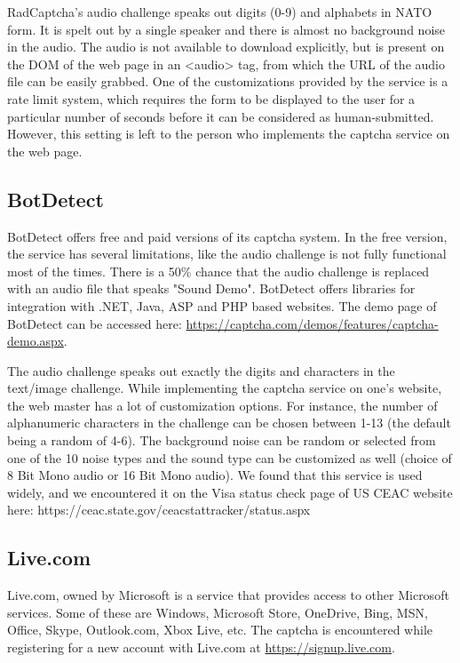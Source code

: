 RadCaptcha's audio challenge speaks out digits (0-9) and alphabets in NATO form. It is 
spelt out by a single speaker and there is almost no background noise in the audio. The 
audio is not available to download explicitly, but is present on the DOM of the web page 
in an <audio> tag, from which the URL of the audio file can be easily grabbed. One of the 
customizations provided by the service is a rate limit system, which requires the form to 
be displayed to the user for a particular number of seconds before it can be considered as 
human-submitted. However, this setting is left to the person who implements the captcha 
service on the web page.

\subsection{BotDetect}

BotDetect offers free and paid versions of its captcha system. In the free version, the 
service has several limitations, like the audio challenge is not fully functional most of 
the times. There is a 50\% chance that the audio challenge is replaced with an audio file 
that speaks "Sound Demo". BotDetect offers libraries for integration with .NET, Java, ASP 
and PHP based websites. The demo page of BotDetect can be accessed here: 
\url{https://captcha.com/demos/features/captcha-demo.aspx}.

The audio challenge speaks out exactly the digits and characters in the text/image challenge. 
While implementing the captcha service on one's website, the web master has a lot of customization 
options. For instance, the number of alphanumeric characters in the challenge can be chosen between 
1-13 (the default being a random of 4-6). The background noise can be random or selected from one of 
the 10 noise types and the sound type can be customized as well (choice of 8 Bit Mono audio or 16 Bit 
Mono audio). We found that this service is used widely, and we encountered it on the Visa status check 
page of US CEAC website here: https://ceac.state.gov/ceacstattracker/status.aspx \newline

\subsection{Live.com}

Live.com, owned by Microsoft is a service that provides access to other Microsoft services. 
Some of these are Windows, Microsoft Store, OneDrive, Bing, MSN, Office, Skype, Outlook.com, 
Xbox Live, etc. The captcha is encountered while registering for a new account with Live.com 
at \url{https://signup.live.com}.


